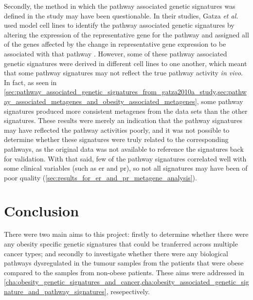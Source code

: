 Secondly, the method in which the pathway associated genetic signatures was defined in the \citet{Gatza2010a} study may have been questionable.
In their studies, Gatza \textit{et al.} used model cell lines to identify the pathway associated genetic signatures by altering the expression of the representative gene for the pathway and assigned all of the genes affected by the change in representative gene expression to be associated with that pathway \citep{Bild2006,Gatza2010a}.
However, some of these pathway associated genetic signatures were derived in different cell lines to one another, which meant that some pathway signatures may not reflect the true pathway activity \textit{in vivo}.
In fact, as seen in \cref{sec:pathway_associated_genetic_signatures_from_gatza2010a_study,sec:pathway_associated_metagenes_and_obesity_associated_metagenes}, some pathway signatures produced more consistent metagenes from the data sets than the other signatures.
These results were merely an indication that the pathway signatures may have reflected the pathway activities poorly, and it was not possible to determine whether these signatures were truly related to the corresponding pathways, as the original data was not available to reference the signatures back for validation.
With that said, few of the pathway signatures correlated well with some clinical variables (such as \gls{er} and \gls{pr}), so not all signatures may have been of poor quality (\cref{sec:results_for_er_and_pr_metagene_analysis}).

\section{Conclusion}
\label{sec:conclusion}

There were two main aims to this project: firstly to determine whether there were any obesity specific genetic signatures that could be tranferred across multiple cancer types; and secondly to investigate whether there were any biological pathways dysregulated in the tumour samples from the patients that were obese compared to the samples from non-obese patients.
These aims were addressed in \cref{cha:obesity_genetic_signatures_and_cancer,cha:obesity_associated_genetic_signature_and_pathway_signatures}, resepectively.

